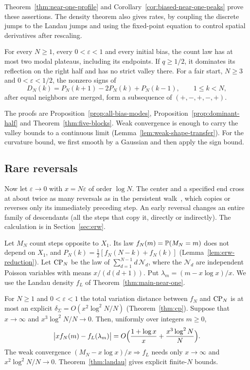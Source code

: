 Theorem~\ref{thm:near-one-profile} and
Corollary~\ref{cor:biased-near-one-peaks} prove these assertions.
The density theorem also gives rates, by coupling the discrete jumps
to the Landau jumps and using the fixed-point equation to control
spatial derivatives after rescaling.

\begin{theorem}\label{thm:shape-engine}
For every $N\ge1$, every $0<\varepsilon<1$ and every initial bias,
the count law has at most two modal plateaus, including its endpoints.
If $q\ge1/2$, it dominates its reflection on the right half and has
no strict valley there. For a fair start, $N\ge3$ and
$0<\varepsilon<1/2$, the nonzero signs of
\[
 D_N(k)=P_N(k+1)-2P_N(k)+P_N(k-1),\qquad 1\le k<N,
\]
after equal neighbors are merged, form a subsequence of $(+,-,+,-,+)$.
\end{theorem}

The proofs are Proposition~\ref{prop:all-bias-modes},
Proposition~\ref{prop:dominant-half} and Theorem~\ref{thm:five-blocks}.
Weak convergence is enough to carry the valley bounds to a continuous
limit (Lemma~\ref{lem:weak-shape-transfer}). For the curvature bound,
we first smooth by a Gaussian and then apply the sign bound.

\subsection{Rare reversals}\label{sec:rare-results}

Now let $\varepsilon\to0$ with $x=N\varepsilon$ of order $\log N$.
The center and a specified end cross at about twice as many reversals
as in the persistent walk~\cite{paperA}, which copies or reverses only
its immediately preceding step. An early reversal changes an entire family of descendants (all the
steps that copy it, directly or indirectly). The calculation is in
Section~\ref{sec:erw}.

Let $M_N$ count steps opposite to $X_1$.
Its law $f_N(m)=\mathbb{P}(M_N=m)$ does not depend on $X_1$, and
$P_N(k)=\frac12[f_N(N-k)+f_N(k)]$ (Lemma~\ref{lem:erw-reduction}). Let
$\mathrm{CP}_N$ be the law of $\sum_{d=1}^{N-1}d\,\mathcal N_d$, where the
$\mathcal N_d$ are independent Poisson variables with means $x/(d(d+1))$.
Put $\lambda_m=(m-x\log x)/x$. We use the Landau density $f_L$
of Theorem~\ref{thm:main-near-one}.

\begin{theorem}\label{thm:main-bulk}
For $N\ge1$ and $0<\varepsilon<1$ the total variation distance between
$f_N$ and $\mathrm{CP}_N$ is at most an explicit $\delta_\Sigma=O(x^2\log^2N/N)$
(Theorem~\ref{thm:cp}). Suppose that $x\to\infty$ and $x^3\log^2N/N\to0$.
Then, uniformly over integers $m\ge0$,
\[
 \bigl\lvert xf_N(m)-f_L(\lambda_m)\bigr\rvert
 =O\Bigl(\frac{1+\log x}{x}+\frac{x^3\log^2N}{N}\Bigr).
\]
The weak convergence $(M_N-x\log x)/x\Rightarrow f_L$ needs only
$x\to\infty$ and $x^2\log^2N/N\to0$.
Theorem~\ref{thm:landau} gives explicit finite-$N$ bounds.
\end{theorem}

